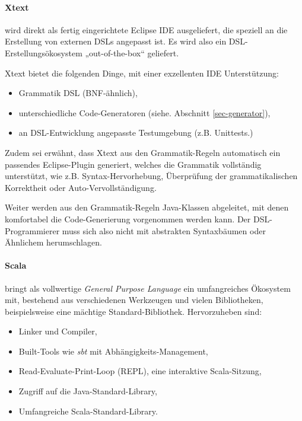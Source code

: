 \paragraph{Xtext} wird direkt als fertig eingerichtete Eclipse IDE
ausgeliefert, die speziell an die Erstellung von externen DSLs angepasst
ist. Es wird also ein DSL-Erstellungsökosystem „out-of-the-box“ geliefert.

Xtext bietet die folgenden Dinge, mit einer exzellenten IDE Unterstützung:

\begin{itemize}
  \item Grammatik DSL (BNF-ähnlich),
  \item unterschiedliche Code-Generatoren (siehe. Abschnitt \ref{sec-generator}),
  \item an DSL-Entwicklung angepasste Testumgebung (z.B. Unittests.)
\end{itemize}

Zudem sei erwähnt, dass Xtext aus den Grammatik-Regeln automatisch ein
passendes Eclipse-Plugin generiert, welches die Grammatik vollständig
unterstützt, wie z.B. Syntax-Hervorhebung, Überprüfung der grammatikalischen
Korrektheit oder Auto-Vervollständigung.

Weiter werden aus den Grammatik-Regeln Java-Klassen abgeleitet, mit denen
komfortabel die Code-Generierung vorgenommen werden kann. Der DSL-Programmierer
muss sich also nicht mit abstrakten Syntaxbäumen oder Ähnlichem herumschlagen.

\paragraph{Scala} bringt als vollwertige \emph{General Purpose Language}
ein umfangreiches Ökosystem mit, bestehend aus verschiedenen Werkzeugen
und vielen Bibliotheken, beispielsweise eine mächtige Standard-Bibliothek.
Hervorzuheben sind:

\begin{itemize}
  \item Linker und Compiler,
  \item Built-Tools wie \emph{sbt} mit Abhängigkeits-Management,
  \item Read-Evaluate-Print-Loop (REPL), eine interaktive Scala-Sitzung,
  \item Zugriff auf die Java-Standard-Library,
  \item Umfangreiche Scala-Standard-Library.
\end{itemize}

